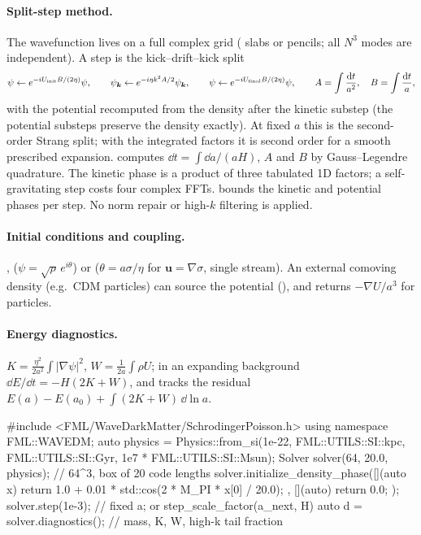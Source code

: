 \paragraph*{Split-step method.} The wavefunction lives on a full complex grid ( slabs or
 pencils; all $N^3$ modes are independent). A step is the kick--drift--kick split
\begin{equation}
\psi\leftarrow e^{-iU_{\rm init}B/(2\eta)}\psi,\qquad
\psi_{\bm{k}}\leftarrow e^{-i\eta k^2A/2}\psi_{\bm{k}},\qquad
\psi\leftarrow e^{-iU_{\rm final}B/(2\eta)}\psi,\qquad A=\int\frac{\mathrm{d} t}{a^2},\quad B=\int\frac{\mathrm{d} t}{a},
\end{equation}
with the potential recomputed from the density after the kinetic substep (the potential substeps preserve the
density exactly). At fixed $a$ this is the second-order Strang split; with the integrated factors it is second order for
a smooth prescribed expansion.  computes $\dd t=\int\dd a/(aH)$, $A$ and $B$ by
Gauss--Legendre quadrature. The kinetic phase is a product of three tabulated 1D factors; a self-gravitating step costs
four complex FFTs.  bounds the kinetic and potential phases per step. No norm repair or high-$k$
filtering is applied.

\paragraph*{Initial conditions and coupling.} , 
($\psi=\sqrt\rho\,e^{i\theta}$) or  ($\theta=a\sigma/\eta$ for
$\bm u=\nabla\sigma$, single stream). An external comoving density (e.g.\ CDM particles) can source the potential
(), and  returns $-\nabla U/a^3$ for particles.

\paragraph*{Energy diagnostics.} $K=\frac{\eta^2}{2a^2}\int|\nabla\psi|^2$, $W=\frac{1}{2a}\int\rho U$; in an expanding
background $\dd E/\dd t=-H(2K+W)$, and  tracks the residual
$E(a)-E(a_0)+\int(2K+W)\,\dd\ln a$.

\begin{cppcode}
#include <FML/WaveDarkMatter/SchrodingerPoisson.h>
using namespace FML::WAVEDM;
auto physics = Physics::from_si(1e-22, FML::UTILS::SI::kpc, FML::UTILS::SI::Gyr, 1e7 * FML::UTILS::SI::Msun);
Solver solver(64, 20.0, physics);                  // 64^3, box of 20 code lengths
solver.initialize_density_phase([](auto x) { return 1.0 + 0.01 * std::cos(2 * M_PI * x[0] / 20.0); },
                                [](auto) { return 0.0; });
solver.step(1e-3);                                 // fixed a; or step_scale_factor(a_next, H)
auto d = solver.diagnostics();                     // mass, K, W, high-k tail fraction
\end{cppcode}


